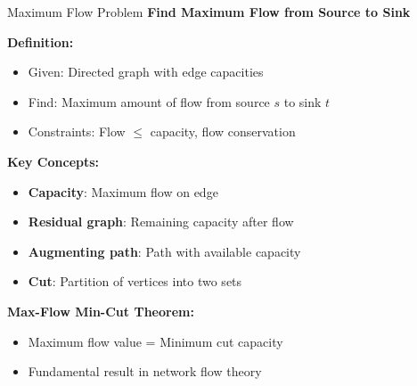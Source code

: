 \documentclass[aspectratio=169]{beamer}
\begin{document}
\begin{frame}{Maximum Flow Problem}
  \textbf{Find Maximum Flow from Source to Sink}

  \vspace{0.3cm}
  \textbf{Definition:}
  \begin{itemize}
    \item Given: Directed graph with edge capacities
    \item Find: Maximum amount of flow from source $s$ to sink $t$
    \item Constraints: Flow $\leq$ capacity, flow conservation
  \end{itemize}

  \vspace{0.3cm}
  \textbf{Key Concepts:}
  \begin{itemize}
    \item \textbf{Capacity}: Maximum flow on edge
    \item \textbf{Residual graph}: Remaining capacity after flow
    \item \textbf{Augmenting path}: Path with available capacity
    \item \textbf{Cut}: Partition of vertices into two sets
  \end{itemize}

  \vspace{0.3cm}
  \textbf{Max-Flow Min-Cut Theorem:}
  \begin{itemize}
    \item Maximum flow value = Minimum cut capacity
    \item Fundamental result in network flow theory
  \end{itemize}
\end{frame}
\end{document}
